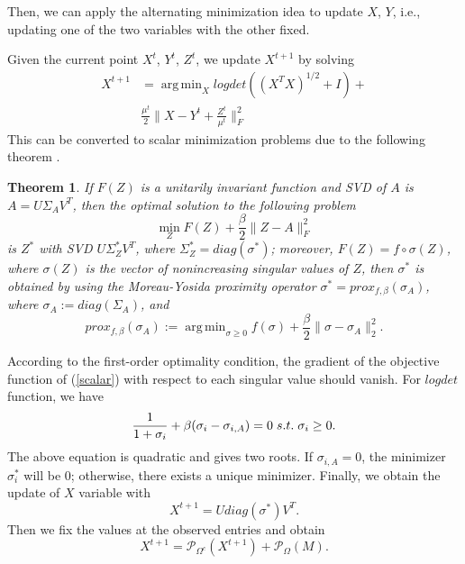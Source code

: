 \documentclass[letterpaper]{article}
\newtheorem{theorem}{Theorem}
\DeclareMathOperator*{\argmin}{arg\,min}
\begin{document}
Then, we can apply the alternating minimization idea to update $X$, $Y$, i.e., updating one of the two variables with the other fixed.

Given the current point $X^t$, $Y^t$,  $Z^t$, we update $X^{t+1}$ by solving
\begin{equation}
\begin{split}
X^{t+1}&=\argmin_{X} logdet ((X^TX)^{1/2}+I)+\\
&\frac{\mu^t}{2}\|X-Y^t+\frac{Z^t}{\mu^t}\|_F^2
\end{split}
\label{noncvx}
\end{equation}
This can be converted to scalar minimization problems due to the following theorem \cite{kang2015logdet}.
\begin{theorem}
\label{thm}
If $F(Z)$ is a unitarily invariant function and SVD of $A$ is $A = U \Sigma_A V^T$, then the optimal solution to the following problem
\begin{equation}
\min_{Z}F(Z)+\frac{\beta}{2}\|Z-A\|_F^{2}
\label{eq:Zobj}
\end{equation}
 is $Z^*$ with SVD $U\Sigma_Z^* V^T$, where $\Sigma_Z^* = diag\left(\sigma^*\right)$; moreover, $F(Z) = f \circ \sigma(Z)$, where $\sigma(Z)$ is the vector of nonincreasing  singular values of $Z$, %
 then $\sigma^*$ is obtained by using the Moreau-Yosida proximity operator
$\sigma^* = prox_{f, \beta} (\sigma_{A})$, where $\sigma_A := diag(\Sigma_A)$, and
\begin{equation}
\label{scalar}
prox_{f, \beta} (\sigma_A) := \argmin_{\sigma\ge 0} f(\sigma) + \frac{\beta}{2}\|\sigma - \sigma_A\|_2^2.
\end{equation}
\end{theorem}
According to the first-order optimality condition, the gradient of the objective function of  (\ref{scalar}) with respect to each singular value should vanish.
For $logdet$ function, we have
\begin{equation}
\label{svdf}
\frac{1}{1+\sigma_i}+\beta (\sigma_{i}-\sigma_{i,A})=0\hspace{0.1cm} s.t. \hspace{0.1cm}\sigma_i \ge  0.%
\end{equation}
The above equation is quadratic and gives two roots. If $\sigma_{i,A}=0$, the minimizer $\sigma_i^*$ will be 0; otherwise, there exists a unique minimizer. Finally, we obtain the update of $X$ variable with
\begin{equation}
X^{t+1}=U diag(\sigma^{*}) V^T.
\end{equation}
Then we fix the values at the observed entries and obtain
\begin{equation}
\label{solveJ}
X^{t+1}=\mathcal{P}_{\Omega^c}(X^{t+1})+\mathcal{P}_\Omega(M).
\end{equation}
\end{document}
